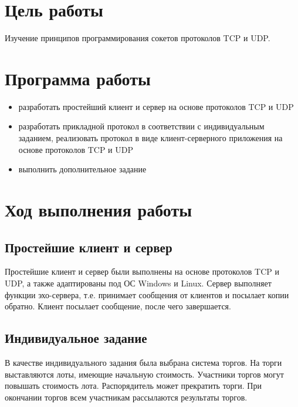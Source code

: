 





\section{Цель работы}

Изучение принципов программирования сокетов протоколов TCP и UDP.

\section{Программа работы}

\begin{itemize}
\item разработать простейший клиент и сервер на основе протоколов TCP и UDP
\item разработать прикладной протокол в соответствии с индивидуальным заданием, реализовать протокол в виде клиент-серверного приложения на основе протоколов TCP и UDP
\item выполнить дополнительное задание
\end{itemize}

\section{Ход выполнения работы}

\subsection{Простейшие клиент и сервер}
Простейшие клиент и сервер были выполнены на основе протоколов TCP и UDP, а также адаптированы под ОС Windows и Linux. Сервер выполняет функции эхо-сервера, т.е. принимает сообщения от клиентов и посылает копии обратно. Клиент посылает сообщение, после чего завершается.

\subsection{Индивидуальное задание}

В качестве индивидуального задания была выбрана система торгов. На торги выставляются лоты, имеющие начальную стоимость. Участники торгов могут повышать стоимость лота. Распорядитель может прекратить торги. При окончании торгов всем участникам рассылаются результаты торгов.

